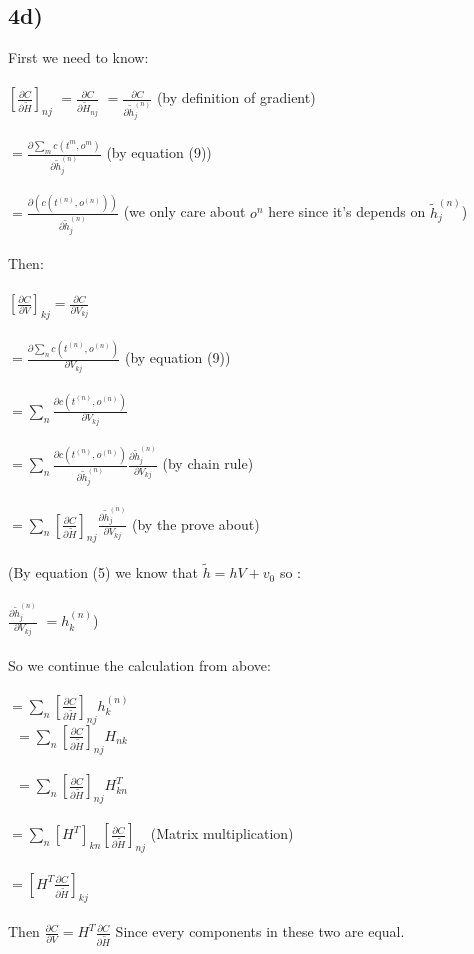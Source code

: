 \documentclass{article}  %
\begin{document}
		\subsection{4d)}
		First we need to know:\\\\
		 $[\frac{\partial C}{\partial \tilde{H}}]_{nj} $ 
		 $= \frac{\partial C}{\partial \tilde{H}_{nj}}$ 
		 $= \frac{\partial C}{\partial \tilde{h}^{(n)}_{j}}$ (by definition of gradient)\\\\
		 $= \frac{\partial \sum_{m} c(t^{m},o^{m})}{\partial \tilde{h}^{(n)}_{j}}$ (by equation (9))\\\\
		 $=\frac{\partial(c(t^{(n)},o^{(n)}))}{\partial\tilde{h}^{(n)}_{j}}$ (we only care about $o^n$ here since it's depends on $\tilde{h}^{(n)}_{j}$)\\\\
		 Then:\\\\
		 $[\frac{\partial C}{\partial V}]_{kj} =  \frac{\partial C}{\partial V_{kj}}$\\\\
		 $= \frac{\partial \sum_{n} c(t^{(n)},o^{(n)})}{\partial V_{kj}}$ (by equation (9))\\\\		$ = \sum_{n}\frac{\partial c(t^{(n)},o^{(n)})}{\partial V_{kj}}$\\\\
		 $ = \sum_{n}\frac{\partial c(t^{(n)},o^{(n)})}{\partial \tilde{h}_{j}^{(n)}}
		 \frac{\partial \tilde{h}_{j}^{(n)}}{\partial V_{kj}}$ (by chain rule)\\\\
		 $ =  \sum_{n}[\frac{\partial C}{\partial \tilde{H}}]_{nj}\frac{\partial \tilde{h}_{j}^{(n)}}{\partial V_{kj}}$ (by the prove about)\\\\
		 (By equation (5) we know that $\tilde{h} = hV + v_{0}$ so :\\\\
		 $\frac{\partial \tilde{h}_{j}^{(n)}}{\partial V_{kj}}$
		 $=h_{k}^{(n)}$)\\\\
		 So we continue the calculation from above:\\\\
		 $ =  \sum_{n}[\frac{\partial C}{\partial \tilde{H}}]_{nj}h_{k}^{(n)}$\\\
		 $ =  \sum_{n}[\frac{\partial C}{\partial \tilde{H}}]_{nj}H_{nk}$\\\\\
		 $ =  \sum_{n}[\frac{\partial C}{\partial \tilde{H}}]_{nj}H^{T}_{kn}$\\\\
		 $ =  \sum_{n}[H^{T}]_{kn}[\frac{\partial C}{\partial \tilde{H}}]_{nj}$ (Matrix multiplication)\\\\
		 $ =  [H^T \frac{\partial C}{\partial \tilde{H}}]_{kj}$\\\\
		 Then $\frac{\partial C}{\partial V} = H^T \frac{\partial C}{\partial \tilde{H}}$ Since every components in these two are equal.
\end{document}
